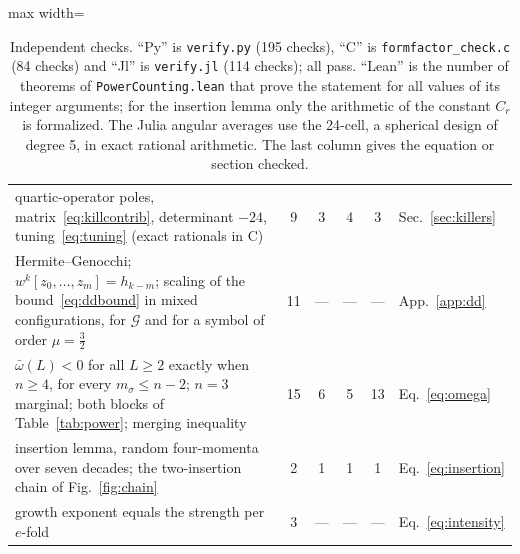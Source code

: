 \documentclass[a4paper,11pt]{article}
\begin{document}
\begin{table}[t]
\begin{adjustbox}{max width=\linewidth}
\begin{tabular}{p{10.6cm}ccccl}
quartic-operator poles, matrix~\eqref{eq:killcontrib}, determinant $-24$, tuning~\eqref{eq:tuning} (exact rationals in C) & 9 & 3 & 4 & 3 & Sec.~\ref{sec:killers}\\
Hermite--Genocchi; $w^k[z_0,\dots,z_m]=h_{k-m}$; scaling of the bound~\eqref{eq:ddbound} in mixed configurations, for $\mathcal G$ and for a symbol of order $\mu=\frac32$ & 11 & --- & --- & --- & App.~\ref{app:dd}\\
$\bar\omega(L)<0$ for all $L\ge2$ exactly when $n\ge4$, for every $m_\sigma\le n-2$; $n=3$ marginal; both blocks of Table~\ref{tab:power}; merging inequality & 15 & 6 & 5 & 13 & Eq.~\eqref{eq:omega}\\
insertion lemma, random four-momenta over seven decades; the two-insertion chain of Fig.~\ref{fig:chain} & 2 & 1 & 1 & 1 & Eq.~\eqref{eq:insertion}\\
growth exponent equals the strength per $e$-fold & 3 & --- & --- & --- & Eq.~\eqref{eq:intensity}\\
\hline\hline
\end{tabular}\end{adjustbox}
\caption{Independent checks. ``Py'' is \texttt{verify.py} (195 checks), ``C'' is \texttt{formfactor\_check.c} (84 checks) and ``Jl'' is \texttt{verify.jl} (114 checks); all pass. ``Lean'' is the number of theorems of \texttt{PowerCounting.lean} that prove the statement for all values of its integer arguments; for the insertion lemma only the arithmetic of the constant $C_r$ is formalized. The Julia angular averages use the 24-cell, a spherical design of degree 5, in exact rational arithmetic. The last column gives the equation or section checked.}
\label{tab:checks}
\end{table}
\end{document}
